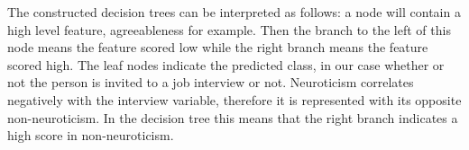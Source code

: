 The constructed decision trees can be interpreted as follows: a node will contain a high level feature, agreeableness for example. Then the branch to the left of this node means the feature scored low while the right branch means the feature scored high. The leaf nodes indicate the predicted class, in our case whether or not the person is invited to a job interview or not. Neuroticism correlates negatively with the interview variable, therefore it is represented with its opposite non-neuroticism. In the decision tree this means that the right branch indicates a high score in non-neuroticism. 